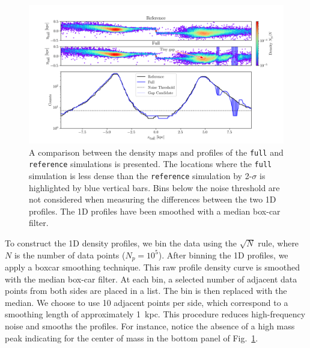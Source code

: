 \documentclass[draft]{aa}
\begin{document}
\begin{appendix}
    \begin{figure}
      \centering
      \includegraphics[width=\linewidth, trim=20 0 15 0]{monte-carlo-009-pouliasis2017pii-GCNBody-2000-milisigma-5-noisefactor-20-boxcarindexlength-shifted-0.png}
      \caption{A comparison between the density maps and profiles of the \texttt{full} and \texttt{reference} simulations is presented. The locations where the \texttt{full} simulation is less dense than the \texttt{reference} simulation by 2-$\sigma$ is highlighted by blue vertical bars. Bins below the noise threshold are not considered when measuring the differences between the two 1D profiles. The 1D profiles have been smoothed with a median box-car filter.}
      \label{fig:profiles}
      \end{figure}

    To construct the 1D density profiles, we bin the data using the $\sqrt{N}$ rule, where $N$ is the number of data points ($N_p = 10^5$). After binning the 1D profiles, we apply a boxcar smoothing technique. This raw profile density curve is smoothed with the median box-car filter. At each bin, a selected number of adjacent data points from both sides are placed in a list. The bin is then replaced with the median. We choose to use 10 adjacent points per side, which correspond to a smoothing length of approximately 1~kpc. This procedure reduces high-frequency noise and smooths the profiles. For instance, notice the absence of a high mass peak indicating for the center of mass in the bottom panel of Fig.~\ref{fig:profiles}.


\end{appendix}
\end{document}
